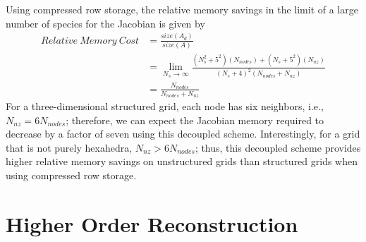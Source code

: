 Using compressed row storage, the relative memory savings in the limit of a
large number of species for the Jacobian is given by
\begin{equation}
  \label{mem_req_eq}
  \begin{split} 
    Relative\ Memory\ Cost &=
    \frac{size(A_d)}{size(A)} \\ &= \lim_{N_s\to\infty}
    \frac{(N_s^2+5^2)(N_{nodes})+(N_s+5^2)(N_{nz})}{(N_s+4)^2(N_{nodes}+N_{nz})} \\
    &= \frac{N_{nodes}}{N_{nodes} + N_{nz}}
  \end{split}
\end{equation}
For a three-dimensional structured grid, each node has six neighbors,
i.e., $N_{nz} = 6N_{nodes}$; therefore, we can expect the Jacobian memory
required to decrease by a factor of seven using this decoupled scheme.
Interestingly, for a grid that is not purely hexahedra, $N_{nz} > 6N_{nodes}$;
thus, this decoupled scheme provides higher relative memory savings on
unstructured grids than structured grids when using compressed row storage.

\section{Higher Order Reconstruction}
\label{sec:2nd-order-reconstruction}

